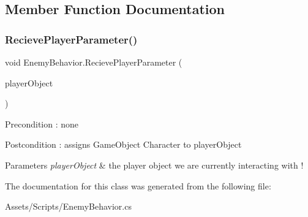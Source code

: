 \subsection{Member Function Documentation}
\mbox{\label{class_enemy_behavior_a1a0d6efe8ce9e53a0e4bddd06c379097}} 
\subsubsection{\texorpdfstring{RecievePlayerParameter()}{RecievePlayerParameter()}}
{\footnotesize\ttfamily void Enemy\+Behavior.\+Recieve\+Player\+Parameter (\begin{DoxyParamCaption}\item[{Game\+Object}]{player\+Object }\end{DoxyParamCaption})}

\begin{DoxyPrecond}{Precondition}
\+: none 
\end{DoxyPrecond}
\begin{DoxyPostcond}{Postcondition}
\+: assigns Game\+Object Character to player\+Object 
\end{DoxyPostcond}

\begin{DoxyParams}{Parameters}
{\em player\+Object} & the player object we are currently interacting with ! \\
\hline
\end{DoxyParams}


The documentation for this class was generated from the following file\+:\begin{DoxyCompactItemize}
\item 
Assets/\+Scripts/Enemy\+Behavior.\+cs\end{DoxyCompactItemize}
